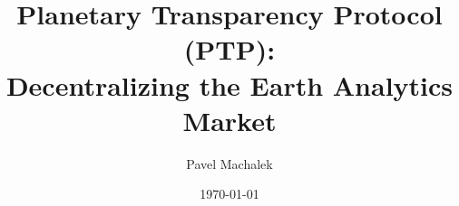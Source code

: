 \documentclass[aps,prl,preprint,groupedaddress]{revtex4}
\begin{document}

\title{Planetary Transparency Protocol (PTP): \\
Decentralizing the Earth Analytics Market}


\author{Pavel Machalek}
\affiliation{}


\date{\today}
\end{document}
